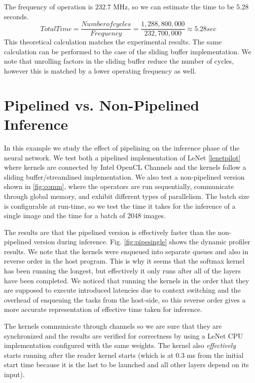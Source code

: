 The frequency of operation is $232.7$ MHz, so we can estimate the time to be 5.28 seconds.
\begin{equation}
 Total Time = \frac{Number of cycles}{Frequency} = \frac{1,288,800,000}{232,700,000}  \approx 5.28 sec
\end{equation}
This theoretical calculation matches the experimental results. The same calculation can be performed to the case of the sliding buffer implementation. We note that unrolling factors in the sliding buffer reduce the number of cycles, however this is matched by a lower operating frequency as well.




\section{Pipelined vs. Non-Pipelined Inference}

In this example we study the effect of pipelining on the inference phase of the neural network. We test both a pipelined implementation of LeNet \ref{lenetpilot} where kernels are connected by Intel OpenCL Channels and the kernels follow a sliding buffer/streamlined implementation. We also test a non-pipelined version shown in \ref{fig:comm}, where the operators are run sequentially, communicate through global memory, and exhibit different types of parallelism. The batch size is configurable at run-time, so we test the time it takes for the inference of a single image and the time for a batch of 2048 images. 

The results are that the pipelined version is effectively faster than the non-pipelined version during inference. Fig. \ref{fig:pipesingle} shows the dynamic profiler results. We note that the kernels were enqueued into separate queues and also in reverse order in the host program. This is why it seems that the softmax kernel has been running the longest, but effectively it only runs after all of the layers have been completed. We noticed that running the kernels in the order that they are supposed to execute introduced latencies due to context switching and the overhead of enqueuing the tasks from the host-side, so this reverse order gives a more accurate representation of effective time taken for inference. 

The kernels communicate through channels so we are sure that they are synchronized and the results are verified for correctness by using a LeNet CPU implementation configured with the same weights. The kernel also \emph{effectively} starts running after the reader kernel starts (which is at 0.3 ms from the initial start time because it is the last to be launched and all other layers depend on its input). 

